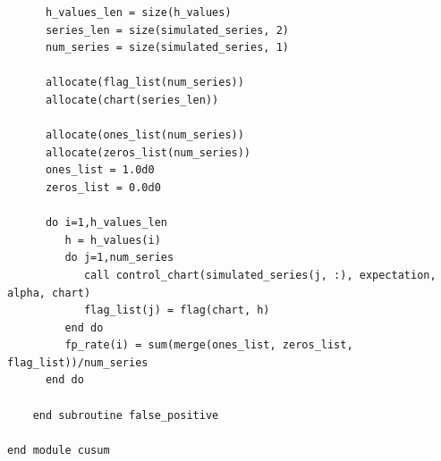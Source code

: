 \documentclass[11pt]{report}
\begin{document}
\begin{verbatim}
      h_values_len = size(h_values)
      series_len = size(simulated_series, 2)
      num_series = size(simulated_series, 1)

      allocate(flag_list(num_series))
      allocate(chart(series_len))

      allocate(ones_list(num_series))
      allocate(zeros_list(num_series))
      ones_list = 1.0d0
      zeros_list = 0.0d0

      do i=1,h_values_len
         h = h_values(i)
         do j=1,num_series
            call control_chart(simulated_series(j, :), expectation, alpha, chart)
            flag_list(j) = flag(chart, h)
         end do
         fp_rate(i) = sum(merge(ones_list, zeros_list, flag_list))/num_series
      end do

    end subroutine false_positive
    
end module cusum
\end{verbatim}
\end{document}
